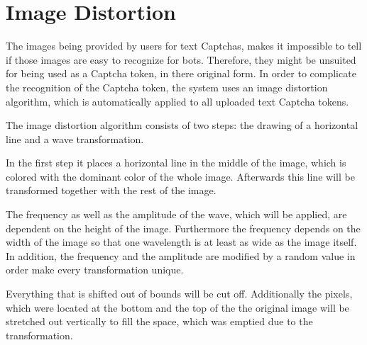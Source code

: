 \section{Image Distortion}
\label{sec:image_distortion}

The images being provided by users for text Captchas, makes it impossible to tell if those images are easy to recognize for bots. Therefore, they might be unsuited for being used as a Captcha token, in there original form. In order to complicate the recognition of the Captcha token, the system uses an image distortion algorithm, which is automatically applied to all uploaded text Captcha tokens.

The image distortion algorithm consists of two steps: the drawing of a horizontal line and a wave transformation.

In the first step it places a horizontal line in the middle of the image, which is colored with the dominant color of the whole image. Afterwards this line will be transformed together with the rest of the image.

The frequency as well as the amplitude of the wave, which will be applied, are dependent on the height of the image. Furthermore the frequency depends on the width of the image so that one wavelength is at least as wide as the image itself. In addition, the frequency and the amplitude are modified by a random value in order make every transformation unique.

Everything that is shifted out of bounds will be cut off. Additionally the pixels, which were located at the bottom and the top of the the original image will be stretched out vertically to fill the space, which was emptied due to the transformation.

\clearpage
